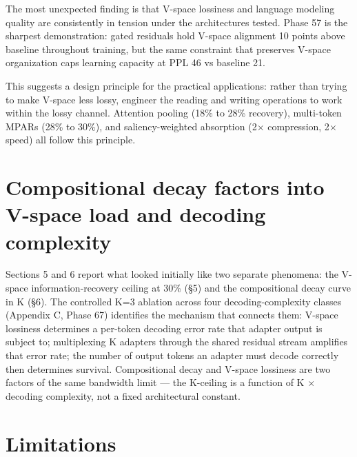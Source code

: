 The most unexpected finding is that V-space lossiness and language modeling quality are consistently in tension under the architectures tested. Phase 57 is the sharpest demonstration: gated residuals hold V-space alignment 10 points above baseline throughout training, but the same constraint that preserves V-space organization caps learning capacity at PPL 46 vs baseline 21.

This suggests a design principle for the practical applications: rather than trying to make V-space less lossy, engineer the reading and writing operations to work within the lossy channel. Attention pooling (18\% to 28\% recovery), multi-token MPARs (28\% to 30\%), and saliency-weighted absorption (2$\times$ compression, 2$\times$ speed) all follow this principle.

\section{Compositional decay factors into V-space load and decoding complexity}\label{compositional-decay-factors-into-v-space-load-and-decoding-complexity}

Sections 5 and 6 report what looked initially like two separate phenomena: the V-space information-recovery ceiling at 30\% (\S 5) and the compositional decay curve in K (\S 6). The controlled K=3 ablation across four decoding-complexity classes (Appendix C, Phase 67) identifies the mechanism that connects them: V-space lossiness determines a per-token decoding error rate that adapter output is subject to; multiplexing K adapters through the shared residual stream amplifies that error rate; the number of output tokens an adapter must decode correctly then determines survival. Compositional decay and V-space lossiness are two factors of the same bandwidth limit --- the K-ceiling is a function of K $\times$ decoding complexity, not a fixed architectural constant.

\section{Limitations}\label{limitations}


